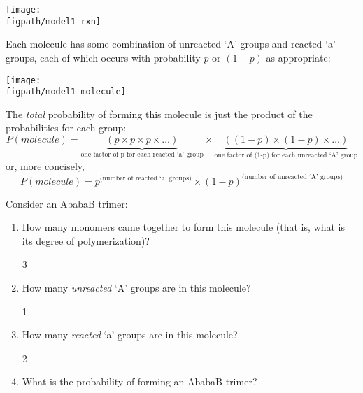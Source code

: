 \begin{activity}
\begin{model}
	\centerline{\texttt{[image: \\figpath/model1-rxn]}}

	Each molecule has some combination of unreacted `A' groups and reacted `a' groups, each of which occurs with probability $p$ or $(1-p)$ as appropriate:

	\centerline{\texttt{[image: \\figpath/model1-molecule]}}
	
	The \emph{total} probability of forming this molecule is just the product of the probabilities for each group:
	\begin{equation*}
		P(molecule) = \underbrace{(p \times p \times p \times \dots)}_{\text{one factor of p for each reacted `a' group}} \times \underbrace{((1-p) \times (1-p) \times \dots)}_{\text{one factor of (1-p) for each unreacted `A' group}} 
	\end{equation*}
or, more concisely,
	\begin{equation*}
		P(molecule) = p^\text{(number of reacted `a' groups)}\times(1-p)^\text{(number of unreacted `A' groups)}
	\end{equation*}


\end{model}

\vspace{0.05in}
\begin{ctqs}
	
	\question Consider an AbabaB trimer:
		\begin{enumerate}
			\item How many monomers came together to form this molecule (that is, what is its degree of polymerization)?
			
				\begin{solution}[0.5in]
					3
				\end{solution}
				
			\item How many \emph{unreacted} `A' groups are in this molecule?
			
				\begin{solution}[0.5in]
					1
				\end{solution}
				
			\item How many \emph{reacted} `a' groups are in this molecule?
			
				\begin{solution}[0.5in]
					2
				\end{solution}
				
			\item What is the probability of forming an AbabaB trimer?
			

\end{enumerate}
\end{ctqs}
\end{activity}
